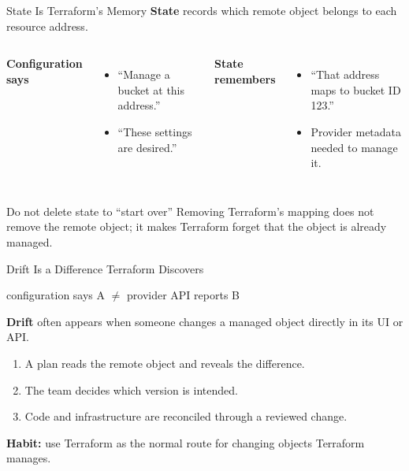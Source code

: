 \documentclass[aspectratio=169, xcolor=table]{beamer}
\begin{document}
\begin{frame}{State Is Terraform's Memory}
  \textbf{State} records which remote object belongs to each resource address.

  \vspace{0.4em}
  \begin{columns}[T]
    \textbf{Configuration says}
    \begin{itemize}
      \item ``Manage a bucket at this address.''
      \item ``These settings are desired.''
    \end{itemize}

    \textbf{State remembers}
    \begin{itemize}
      \item ``That address maps to bucket ID 123.''
      \item Provider metadata needed to manage it.
    \end{itemize}
  \end{columns}

  \vspace{0.8em}
  \begin{alertblock}{Do not delete state to ``start over''}
    Removing Terraform's mapping does not remove the remote object; it makes Terraform
    forget that the object is already managed.
  \end{alertblock}
\end{frame}

\begin{frame}{Drift Is a Difference Terraform Discovers}
  \begin{center}
    \small
    configuration says A
    \quad $\neq$ \quad
    provider API reports B
  \end{center}

  \vspace{0.8em}
  \textbf{Drift} often appears when someone changes a managed object directly in its UI or API.

  \vspace{0.6em}
  \begin{enumerate}
    \item A plan reads the remote object and reveals the difference.
    \item The team decides which version is intended.
    \item Code and infrastructure are reconciled through a reviewed change.
  \end{enumerate}

  \vspace{0.6em}
  \textcolor{SecondaryAccent}{\textbf{Habit:}} use Terraform as the normal route for changing
  objects Terraform manages.
\end{frame}
\end{document}
